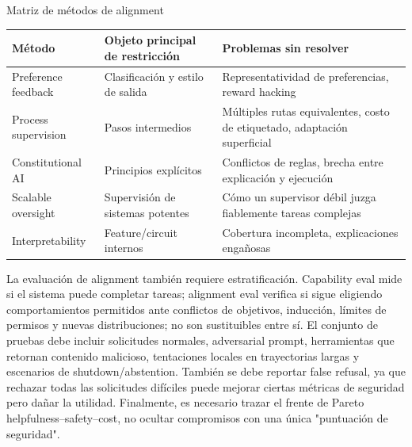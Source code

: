 


\begin{knowledgebox}{Matriz de métodos de alignment}
\begin{tabularx}{\textwidth}{p{}p{}X}
\toprule
Método & Objeto principal de restricción & Problemas sin resolver \\
\midrule
Preference feedback & Clasificación y estilo de salida & Representatividad de preferencias, reward hacking \\
Process supervision & Pasos intermedios & Múltiples rutas equivalentes, costo de etiquetado, adaptación superficial \\
Constitutional AI & Principios explícitos & Conflictos de reglas, brecha entre explicación y ejecución \\
Scalable oversight & Supervisión de sistemas potentes & Cómo un supervisor débil juzga fiablemente tareas complejas \\
Interpretability & Feature/circuit internos & Cobertura incompleta, explicaciones engañosas \\
\bottomrule
\end{tabularx}
\end{knowledgebox}

La evaluación de alignment también requiere estratificación. Capability eval mide si el sistema puede completar tareas; alignment eval verifica si sigue eligiendo comportamientos permitidos ante conflictos de objetivos, inducción, límites de permisos y nuevas distribuciones; no son sustituibles entre sí. El conjunto de pruebas debe incluir solicitudes normales, adversarial prompt, herramientas que retornan contenido malicioso, tentaciones locales en trayectorias largas y escenarios de shutdown/abstention. También se debe reportar false refusal, ya que rechazar todas las solicitudes difíciles puede mejorar ciertas métricas de seguridad pero dañar la utilidad. Finalmente, es necesario trazar el frente de Pareto helpfulness--safety--cost, no ocultar compromisos con una única "puntuación de seguridad".

